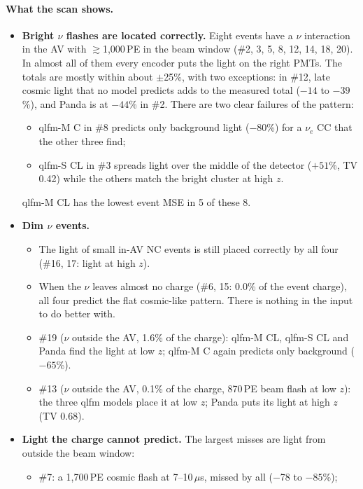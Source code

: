 \paragraph{What the scan shows.}
\begin{itemize}
  \item \textbf{Bright $\nu$ flashes are located correctly.} Eight events have a $\nu$ interaction in the AV with $\gtrsim$1{,}000\,PE in the beam window (\#2, 3, 5, 8, 12, 14, 18, 20). In almost all of them every encoder puts the light on the right PMTs. The totals are mostly within about $\pm$25\%, with two exceptions: in \#12, late cosmic light that no model predicts adds to the measured total ($-14$ to $-39$\%), and Panda is at $-44$\% in \#2. There are two clear failures of the pattern:
  \begin{itemize}
    \item qlfm-M C in \#8 predicts only background light ($-80$\%) for a $\nu_e$ CC that the other three find;
    \item qlfm-S CL in \#3 spreads light over the middle of the detector ($+51$\%, TV 0.42) while the others match the bright cluster at high $z$.
  \end{itemize}
  qlfm-M CL has the lowest event MSE in 5 of these 8.
  \item \textbf{Dim $\nu$ events.}
  \begin{itemize}
    \item The light of small in-AV NC events is still placed correctly by all four (\#16, 17: light at high $z$).
    \item When the $\nu$ leaves almost no charge (\#6, 15: 0.0\% of the event charge), all four predict the flat cosmic-like pattern. There is nothing in the input to do better with.
    \item \#19 ($\nu$ outside the AV, 1.6\% of the charge): qlfm-M CL, qlfm-S CL and Panda find the light at low $z$; qlfm-M C again predicts only background ($-65$\%).
    \item \#13 ($\nu$ outside the AV, 0.1\% of the charge, 870\,PE beam flash at low $z$): the three qlfm models place it at low $z$; Panda puts its light at high $z$ (TV 0.68).
  \end{itemize}
  \item \textbf{Light the charge cannot predict.} The largest misses are light from outside the beam window:
  \begin{itemize}
    \item \#7: a 1{,}700\,PE cosmic flash at 7--10\,$\mu$s, missed by all ($-$78 to $-85$\%);

\end{itemize}
\end{itemize}

